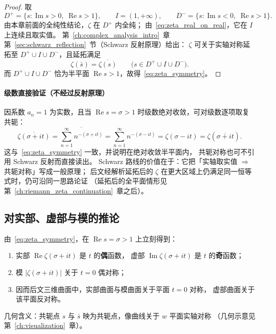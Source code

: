 \begin{proof}
取
\[
  D^{+}
  =\bigl\{s:\operatorname{Im}s>0,\;\operatorname{Re}s>1\bigr\},
  \qquad
  I=(1,+\infty),
  \qquad
  D^{-}
  =\bigl\{s:\operatorname{Im}s<0,\;\operatorname{Re}s>1\bigr\}.
\]
由本章前面的全纯性结论，$\zeta$ 在 $D^{+}$ 内全纯；
由~\eqref{eq:zeta_real_on_real}，它在 $I$ 上连续且取实值。
第~\ref{ch:complex_analysis_intro}~章第~\ref{sec:schwarz_reflection}~节（Schwarz 反射原理）给出：
$\zeta$ 可关于实轴对称延拓至 $D^{+}\cup I\cup D^{-}$，且延拓满足
\[
  \zeta(\bar{s})=\overline{\zeta(s)}
  \qquad\bigl(s\in D^{+}\cup I\cup D^{-}\bigr).
\]
而 $D^{+}\cup I\cup D^{-}$ 恰为半平面 $\operatorname{Re}s>1$，故得~\eqref{eq:zeta_symmetry}。
\end{proof}

\paragraph{级数直接验证（不经过反射原理）}
因系数 $a_n=1$ 为实数，且当 $\operatorname{Re}s=\sigma>1$ 时级数绝对收敛，可对级数逐项取复共轭：
\[
  \overline{\zeta(\sigma+it)}
  =\overline{\sum_{n=1}^{\infty}n^{-(\sigma+it)}}
  =\sum_{n=1}^{\infty}n^{-(\sigma-it)}
  =\zeta(\sigma-it)
  =\zeta(\overline{\sigma+it}).
\]
这与~\eqref{eq:zeta_symmetry} 一致，并说明在绝对收敛半平面内，
共轭对称也可不引用 Schwarz 反射而直接读出。
Schwarz 路线的价值在于：它把「实轴取实值 $\Rightarrow$ 共轭对称」写成一般原理；
后文经解析延拓后的 $\zeta$ 在更大区域上仍满足同一恒等式时，仍可沿同一思路论证
（延拓后的全平面情形见第~\ref{ch:riemann_zeta_continuation}~章之后）。

\subsection{对实部、虚部与模的推论}

由~\eqref{eq:zeta_symmetry}，在 $\operatorname{Re}s=\sigma>1$ 上立刻得到：
\begin{enumerate}[label=(\roman*)]
  \item 实部 $\operatorname{Re}\zeta(\sigma+it)$ 是 $t$ 的\textbf{偶}函数，
        虚部 $\operatorname{Im}\zeta(\sigma+it)$ 是 $t$ 的\textbf{奇}函数；
  \item 模 $|\zeta(\sigma+it)|$ 关于 $t=0$ 偶对称；
  \item 因而后文三维曲面中，实部曲面与模曲面关于平面 $t=0$ 对称，
        虚部曲面关于该平面反对称。
\end{enumerate}
几何含义：共轭点 $s$ 与 $\bar{s}$ 映为共轭点，像曲线关于 $w$ 平面实轴对称
（几何示意见第~\ref{ch:visualization}~章）。


